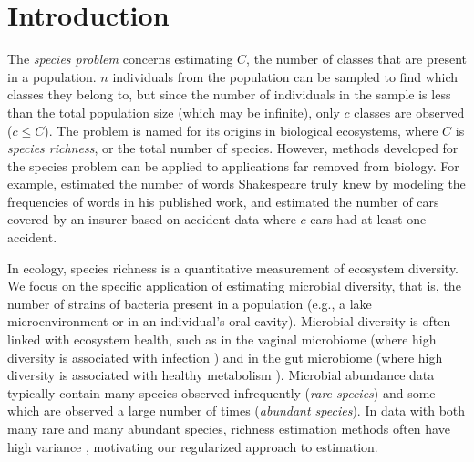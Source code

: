 \documentclass[12pt]{article}
\begin{document}
\newpage
{} %


%
%
%


\section{Introduction}
\label{sec:introduction}

The \textit{species problem} concerns estimating $C$, the number of classes that are present in a population.
$n$ individuals from the population can be sampled to find which classes they belong to, but since the  number of individuals in the sample is less than the total population size (which may be infinite), only $c$ classes are observed ($c \leq C$). The problem is named for its origins in biological ecosystems, where $C$ is \textit{species richness}, or the total number of species.  However, methods developed for the species problem can be applied to applications far removed from biology.  For example, \citet{efron_1976} estimated the number of words Shakespeare truly knew by modeling the frequencies of words in his published work, and  \citet{fegatelli_2018} estimated the number of cars covered by an insurer based on accident data where $c$ cars had at least one accident.

In ecology, species richness is a quantitative measurement of ecosystem diversity.  We focus on the specific application of estimating microbial diversity, that is, the number of strains of bacteria present in a population (e.g., a lake microenvironment or in an individual's oral cavity).
Microbial diversity is often linked with ecosystem health, such as in the vaginal microbiome (where high diversity is associated with infection \citep{Oakley:2008uo}) and in the gut microbiome (where high diversity is associated with healthy metabolism \citep{Morgan:2012bm,Minot:2019hc}).
Microbial abundance data typically contain many species observed infrequently (\textit{rare species}) and some which are observed a large number of times (\textit{abundant species}).  In data with both many rare and many abundant species, richness estimation methods often have high variance \citep{wang_2005,willis_2015}, motivating our regularized approach to estimation.
\end{document}
